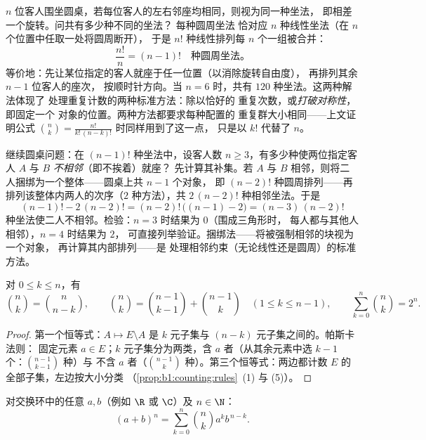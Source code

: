 \begin{example}[圆桌：对对称性取商]\label{ex:b1:counting:roundtable}
$n$ 位客人围坐圆桌，若每位客人的左右邻座均相同，则视为同一种坐法，
即相差一个旋转。问共有多少种不同的坐法？
每种圆周坐法
恰对应 $n$ 种线性坐法（在 $n$ 个位置中任取一处将圆周断开），
于是 $n!$ 种线性排列每
$n$ 个一组被合并：
\[
\frac{n!}{n} = (n-1)! \quad\text{种圆周坐法。}
\]
等价地：先让某位指定的客人就座于任一位置（以消除旋转自由度），
再排列其余 $n - 1$ 位客人的座次，
按顺时针方向。当 $n = 6$ 时，共有 $120$ 种坐法。这两种解法体现了
处理重复计数的两种标准方法：除以恰好的
重复次数，或\emph{打破对称性}，即固定一个
对象的位置。两种方法都要求每种配置的
重复群大小相同——上文证明公式
$\binom nk = \frac{n!}{k!\,(n-k)!}$ 时同样用到了这一点，
只是以 $k!$ 代替了 $n$。
\end{example}

\begin{example}[增加约束]\label{ex:b1:counting:constraint}
继续圆桌问题：在 $(n-1)!$ 种坐法中，设客人数 $n \geq
3$，有多少种使两位指定客人 $A$ 与 $B$ \emph{不相邻}（即不挨着）就座？
先计算其补集。若 $A$ 与 $B$
相邻，则将二人捆绑为一个整体——圆桌上共 $n - 1$ 个对象，
即 $(n-2)!$ 种圆周排列——再
排列该整体内两人的次序（$2$ 种方法），共 $2\,(n-2)!$
种相邻坐法。于是
\[
(n-1)! - 2\,(n-2)! = (n-2)!\,\bigl((n - 1) - 2\bigr)
= (n-3)\,(n-2)!
\]
种坐法使二人不相邻。检验：$n = 3$ 时结果为 $0$（围成三角形时，
每人都与其他人相邻），$n = 4$ 时结果为 $2$，
可直接列举验证。捆绑法——将被强制相邻的块视为一个对象，
再计算其内部排列——是
处理相邻约束（无论线性还是圆周）的标准方法。
\end{example}

\begin{proposition}[基本恒等式]\label{prop:b1:counting:identities}
对 $0 \leq k \leq n$，有
\[
\binom{n}{k} = \binom{n}{n-k},
\qquad
\binom{n}{k} = \binom{n-1}{k-1} + \binom{n-1}{k}
\quad (1 \leq k \leq n-1),
\qquad
\sum_{k=0}^{n} \binom{n}{k} = 2^n .
\]
\end{proposition}

\begin{proof}
第一个恒等式：$A \mapsto E \setminus A$ 是
$k$ 元子集与 $(n-k)$ 元子集之间的。帕斯卡法则：
固定元素 $a \in E$；$k$ 元子集分为两类，含
$a$ 者（从其余元素中选 $k - 1$ 个：$\binom{n-1}{k-1}$ 种）与
不含 $a$ 者（$\binom{n-1}{k}$ 种）。第三个恒等式：两边都计数
$E$ 的全部子集，左边按大小分类
（\cref{prop:b1:counting:rules}~(1) 与 (5)）。
\end{proof}

\begin{theorem}[二项式定理]\label{thm:b1:counting:binomial}
对交换环中的任意 $a, b$（例如 $\R$ 或 $\C$）及 $n \in \N$：
\[
(a + b)^n = \sum_{k=0}^{n} \binom{n}{k} a^k b^{\,n-k} .
\]
\end{theorem}

